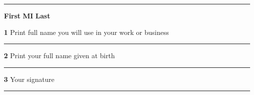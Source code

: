\documentclass[12pt]{article}
\begin{document}
	\begin{framed}
		\vspace{0.25cm}
		\hrule
		\vspace{0.25cm}
		
		{\fontsize{9pt}{18pt}\selectfont \hspace{9cm}\textbf{First} \hfil \textbf{MI} \hfil \textbf{Last} }
		
		
		{\fontsize{24pt}{30pt}\selectfont \textbf{1}\hspace{0.05cm} }
		{\fontsize{9pt}{18pt}\selectfont Print full name you will use in your work or business}
		\vspace{0.25cm}
		\hrule
		\vspace{0.25cm}
		
		{\fontsize{24pt}{30pt}\selectfont \textbf{2}\hspace{0.05cm} }
		{\fontsize{9pt}{18pt}\selectfont Print your full name given at birth}
		\vspace{0.25cm}
		\hrule
		\vspace{0.25cm}
		
		{\fontsize{24pt}{30pt}\selectfont \textbf{3}\hspace{0.05cm} }
		{\fontsize{9pt}{18pt}\selectfont Your signature}
		\vspace{0.25cm}
		\hrule
		\vspace{0.25cm}
		
		
		
	\end{framed}






























	
\end{document}
